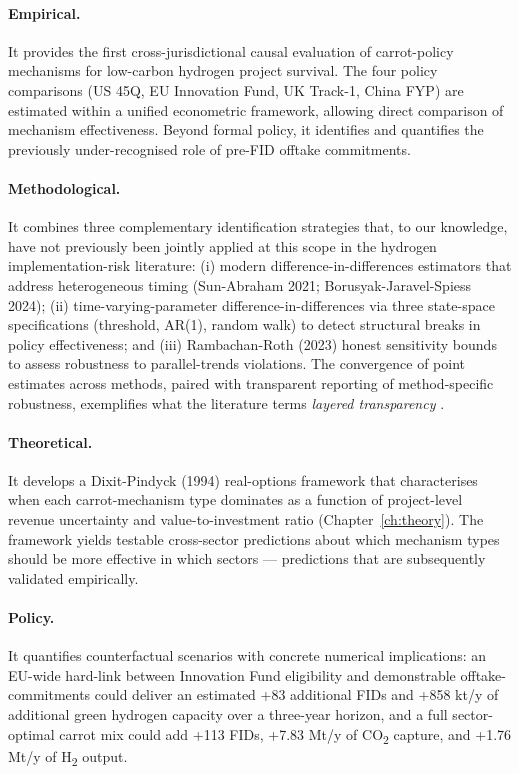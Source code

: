 \paragraph{Empirical.} It provides the first cross-jurisdictional causal evaluation of carrot-policy mechanisms for low-carbon hydrogen project survival. The four policy comparisons (US 45Q, EU Innovation Fund, UK Track-1, China FYP) are estimated within a unified econometric framework, allowing direct comparison of mechanism effectiveness. Beyond formal policy, it identifies and quantifies the previously under-recognised role of pre-FID offtake commitments.

\paragraph{Methodological.} It combines three complementary identification strategies that, to our knowledge, have not previously been jointly applied at this scope in the hydrogen implementation-risk literature: (i) modern difference-in-differences estimators that address heterogeneous timing (Sun-Abraham 2021; Borusyak-Jaravel-Spiess 2024); (ii) time-varying-parameter difference-in-differences via three state-space specifications (threshold, AR(1), random walk) to detect structural breaks in policy effectiveness; and (iii) Rambachan-Roth (2023) honest sensitivity bounds to assess robustness to parallel-trends violations. The convergence of point estimates across methods, paired with transparent reporting of method-specific robustness, exemplifies what the literature terms \emph{layered transparency} \cite{rambachan2023more}.

\paragraph{Theoretical.} It develops a Dixit-Pindyck (1994) real-options framework that characterises when each carrot-mechanism type dominates as a function of project-level revenue uncertainty and value-to-investment ratio (Chapter~\ref{ch:theory}). The framework yields testable cross-sector predictions about which mechanism types should be more effective in which sectors --- predictions that are subsequently validated empirically.

\paragraph{Policy.} It quantifies counterfactual scenarios with concrete numerical implications: an EU-wide hard-link between Innovation Fund eligibility and demonstrable offtake-commitments could deliver an estimated +83 additional FIDs and +858 kt/y of additional green hydrogen capacity over a three-year horizon, and a full sector-optimal carrot mix could add +113 FIDs, +7.83 Mt/y of CO\textsubscript{2} capture, and +1.76 Mt/y of H\textsubscript{2} output.

